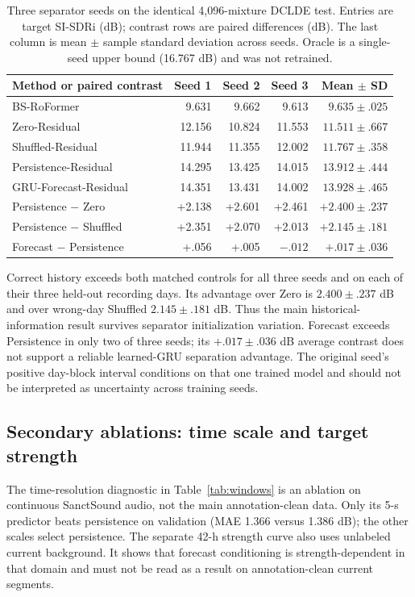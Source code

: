 \documentclass[conference]{IEEEtran}
\begin{document}
\begin{table}[t]
\caption{Three separator seeds on the identical 4,096-mixture DCLDE test.
Entries are target SI-SDRi (dB); contrast rows are paired differences (dB).
The last column is mean $\pm$ sample standard deviation across seeds.
Oracle is a single-seed upper bound (16.767 dB) and was not retrained.}
\label{tab:seeds}\centering\footnotesize
\begin{tabular}{lrrrr}
\toprule
Method or paired contrast & Seed 1 & Seed 2 & Seed 3 & Mean $\pm$ SD\\
\midrule
BS-RoFormer & 9.631 & 9.662 & 9.613 & $9.635\pm.025$\\
Zero-Residual & 12.156 & 10.824 & 11.553 & $11.511\pm.667$\\
Shuffled-Residual & 11.944 & 11.355 & 12.002 & $11.767\pm.358$\\
Persistence-Residual & 14.295 & 13.425 & 14.015 & $13.912\pm.444$\\
GRU-Forecast-Residual & 14.351 & 13.431 & 14.002 & $13.928\pm.465$\\
\midrule
Persistence $-$ Zero & +2.138 & +2.601 & +2.461 & $+2.400\pm.237$\\
Persistence $-$ Shuffled & +2.351 & +2.070 & +2.013 & $+2.145\pm.181$\\
Forecast $-$ Persistence & +.056 & +.005 & $-.012$ & $+.017\pm.036$\\
\bottomrule
\end{tabular}
\end{table}

Correct history exceeds both matched controls for all three seeds and on
each of their three held-out recording days. Its advantage over Zero is
$2.400\pm.237$ dB and over wrong-day Shuffled $2.145\pm.181$ dB. Thus the
main historical-information result survives separator initialization
variation. Forecast exceeds Persistence in only two of three seeds; its
$+.017\pm.036$ dB average contrast does not support a reliable learned-GRU
separation advantage. The original seed's positive day-block interval
conditions on that one trained model and should not be interpreted as
uncertainty across training seeds.

\subsection{Secondary ablations: time scale and target strength}
The time-resolution diagnostic in Table~\ref{tab:windows} is an ablation on
continuous SanctSound audio, not the main annotation-clean data.  Only its
5-s predictor beats persistence on validation (MAE 1.366 versus 1.386 dB);
the other scales select persistence.  The separate 42-h strength curve also
uses unlabeled current background.  It shows that forecast conditioning is
strength-dependent in that domain and must not be read as a result on
annotation-clean current segments.
\end{document}
